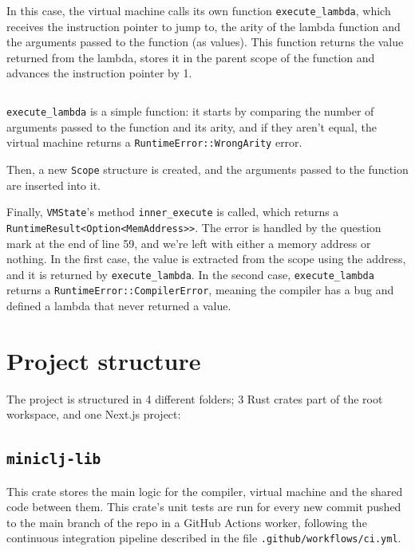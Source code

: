 \documentclass[11pt]{scrreprt}
\begin{document}
\inputminted[firstline=94,lastline=99,breaklines=true,autogobble]{rust}{/home/mario/git/MarioJim/miniclj/miniclj-lib/src/vm/state.rs}

In this case, the virtual machine calls its own function \texttt{execute\_lambda}, which receives the instruction pointer to jump to, the arity of the lambda function and the arguments passed to the function (as values). This function returns the value returned from the lambda, stores it in the parent scope of the function and advances the instruction pointer by 1.

\inputminted[firstline=40,lastline=66,breaklines=true,autogobble]{rust}{/home/mario/git/MarioJim/miniclj/miniclj-lib/src/vm/state.rs}

\texttt{execute\_lambda} is a simple function: it starts by comparing the number of arguments passed to the function and its arity, and if they aren't equal, the virtual machine returns a \texttt{RuntimeError::WrongArity} error.

Then, a new \texttt{Scope} structure is created, and the arguments passed to the function are inserted into it.

Finally, \texttt{VMState}'s method \texttt{inner\_execute} is called, which returns a \texttt{RuntimeResult<Option<MemAddress>>}. The error is handled by the question mark at the end of line 59, and we're left with either a memory address or nothing. In the first case, the value is extracted from the scope using the address, and it is returned by \texttt{execute\_lambda}. In the second case, \texttt{execute\_lambda} returns a \texttt{RuntimeError::CompilerError}, meaning the compiler has a bug and defined a lambda that never returned a value.


\chapter{Project structure}
The project is structured in 4 different folders; 3 Rust crates part of the root workspace, and one Next.js project:

\section{\texttt{miniclj-lib}}
This crate stores the main logic for the compiler, virtual machine and the shared code between them. This crate's unit tests are run for every new commit pushed to the main branch of the repo in a GitHub Actions worker, following the continuous integration pipeline described in the file \texttt{.github/workflows/ci.yml}.
\end{document}
